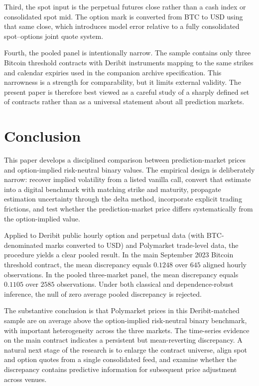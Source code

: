 \documentclass[11pt]{article}
\numberwithin{equation}{section}
\theoremstyle{plain}
\begin{document}
Third, the spot input is the perpetual futures close rather than a cash index or consolidated spot mid. The option mark is converted from BTC to USD using that same close, which introduces model error relative to a fully consolidated spot--options joint quote system.

Fourth, the pooled panel is intentionally narrow. The sample contains only three Bitcoin threshold contracts with Deribit instruments mapping to the same strikes and calendar expiries used in the companion archive specification. This narrowness is a strength for comparability, but it limits external validity. The present paper is therefore best viewed as a careful study of a sharply defined set of contracts rather than as a universal statement about all prediction markets.

\section{Conclusion}
This paper develops a disciplined comparison between prediction-market prices and option-implied risk-neutral binary values. The empirical design is deliberately narrow: recover implied volatility from a listed vanilla call, convert that estimate into a digital benchmark with matching strike and maturity, propagate estimation uncertainty through the delta method, incorporate explicit trading frictions, and test whether the prediction-market price differs systematically from the option-implied value.

Applied to Deribit public hourly option and perpetual data (with BTC-denominated marks converted to USD) and Polymarket trade-level data, the procedure yields a clear pooled result. In the main September 2023 Bitcoin threshold contract, the mean discrepancy equals $0.1248$ over $645$ aligned hourly observations. In the pooled three-market panel, the mean discrepancy equals $0.1105$ over $2585$ observations. Under both classical and dependence-robust inference, the null of zero average pooled discrepancy is rejected.

The substantive conclusion is that Polymarket prices in this Deribit-matched sample are on average above the option-implied risk-neutral binary benchmark, with important heterogeneity across the three markets. The time-series evidence on the main contract indicates a persistent but mean-reverting discrepancy. A natural next stage of the research is to enlarge the contract universe, align spot and option quotes from a single consolidated feed, and examine whether the discrepancy contains predictive information for subsequent price adjustment across venues.
\end{document}
